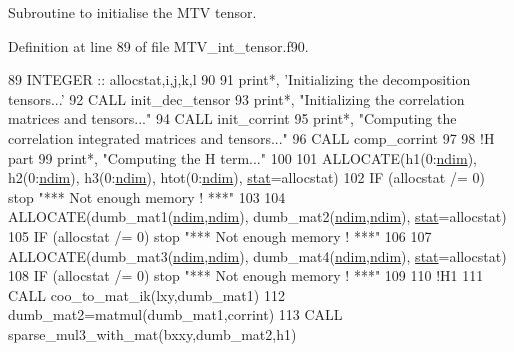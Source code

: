 Subroutine to initialise the M\+TV tensor. 



Definition at line 89 of file M\+T\+V\+\_\+int\+\_\+tensor.\+f90.


\begin{DoxyCode}
89     \textcolor{keywordtype}{INTEGER} :: allocstat,i,j,k,l
90 
91     print*, \textcolor{stringliteral}{'Initializing the decomposition tensors...'}
92     \textcolor{keyword}{CALL }init\_dec\_tensor
93     print*, \textcolor{stringliteral}{"Initializing the correlation matrices and tensors..."}
94     \textcolor{keyword}{CALL }init\_corrint
95     print*, \textcolor{stringliteral}{"Computing the correlation integrated matrices and tensors..."}
96     \textcolor{keyword}{CALL }comp\_corrint
97     
98     \textcolor{comment}{!H part}
99     print*, \textcolor{stringliteral}{"Computing the H term..."}
100 
101     \textcolor{keyword}{ALLOCATE}(h1(0:\hyperlink{namespaceparams_a2323fe1773f086e20c14f266351c482b}{ndim}), h2(0:\hyperlink{namespaceparams_a2323fe1773f086e20c14f266351c482b}{ndim}), h3(0:\hyperlink{namespaceparams_a2323fe1773f086e20c14f266351c482b}{ndim}), htot(0:\hyperlink{namespaceparams_a2323fe1773f086e20c14f266351c482b}{ndim}), 
      \hyperlink{namespacestat}{stat}=allocstat)
102     \textcolor{keywordflow}{IF} (allocstat /= 0) stop \textcolor{stringliteral}{"*** Not enough memory ! ***"}
103 
104     \textcolor{keyword}{ALLOCATE}(dumb\_mat1(\hyperlink{namespaceparams_a2323fe1773f086e20c14f266351c482b}{ndim},\hyperlink{namespaceparams_a2323fe1773f086e20c14f266351c482b}{ndim}), dumb\_mat2(\hyperlink{namespaceparams_a2323fe1773f086e20c14f266351c482b}{ndim},\hyperlink{namespaceparams_a2323fe1773f086e20c14f266351c482b}{ndim}), \hyperlink{namespacestat}{stat}=allocstat)
105     \textcolor{keywordflow}{IF} (allocstat /= 0) stop \textcolor{stringliteral}{"*** Not enough memory ! ***"}
106 
107     \textcolor{keyword}{ALLOCATE}(dumb\_mat3(\hyperlink{namespaceparams_a2323fe1773f086e20c14f266351c482b}{ndim},\hyperlink{namespaceparams_a2323fe1773f086e20c14f266351c482b}{ndim}), dumb\_mat4(\hyperlink{namespaceparams_a2323fe1773f086e20c14f266351c482b}{ndim},\hyperlink{namespaceparams_a2323fe1773f086e20c14f266351c482b}{ndim}), \hyperlink{namespacestat}{stat}=allocstat)
108     \textcolor{keywordflow}{IF} (allocstat /= 0) stop \textcolor{stringliteral}{"*** Not enough memory ! ***"}
109 
110     \textcolor{comment}{!H1}
111     \textcolor{keyword}{CALL }coo\_to\_mat\_ik(lxy,dumb\_mat1)
112     dumb\_mat2=matmul(dumb\_mat1,corrint)
113     \textcolor{keyword}{CALL }sparse\_mul3\_with\_mat(bxxy,dumb\_mat2,h1)

\end{DoxyCode}
